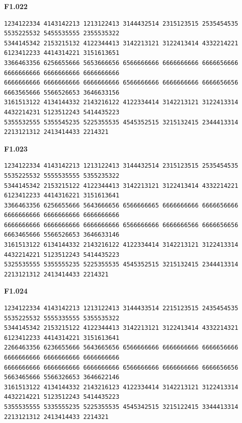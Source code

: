 \noindent\begin{minipage}{\linewidth}\textbf{F1.022}
\begin{lstlisting}
1234122334 4143142213 1213122413 3144432514 2315123515 2535454535 5535225532 5455535555 2355535322
5344145342 2153215132 4122344413 3142213121 3122413414 4332214221 6123412233 4414314221 3151613651
3366463356 6256655666 5653666656 6566666666 6666666666 6666656666 6666666666 6666666666 6666666666
6666666666 6666666666 6666666666 6566666666 6666666666 6666656656 6663565666 5566526653 3646633156
3161513122 4134144332 2143216122 4122334414 3142213121 3122413314 4432214231 5123512243 5414435223
5355532555 5355545235 5225355535 4545352515 3215132415 2344413314 2213121312 2413414433 2214321
\end{lstlisting}
\end{minipage}\par\smallskip

\noindent\begin{minipage}{\linewidth}\textbf{F1.023}
\begin{lstlisting}
1234122334 4143142213 1213122413 3144432514 2315123515 2535454535 5535225532 5555535555 5355235322
5344145342 2153215122 4122344413 3142213121 3122413414 4332214221 6123412233 4414316221 3151613641
3366463356 6256655666 5643666656 6566666665 6666666666 6666656666 6666666666 6666666666 6666666666
6666666666 6666666666 6666666666 6566666666 6666666566 6666656656 6663465666 5566526653 3646633146
3161513122 6134144332 2143216122 4122334414 3142213121 3122413314 4432214221 5123512243 5414435223
5325535555 5355555235 5225355535 4545352515 3215132415 2344413314 2213121312 2413414433 2214321
\end{lstlisting}
\end{minipage}\par\smallskip

\noindent\begin{minipage}{\linewidth}\textbf{F1.024}
\begin{lstlisting}
1234122334 4143142213 1213122413 3144433514 2215123515 2435454535 5535225532 5555335555 5355535322
5344145342 2153215122 4122344413 3142213121 3122413414 4332214321 6123412233 4414314221 3151613641
2266463356 6236655666 5643665656 6566666666 6666666666 6666656666 6666666666 6666666666 6666666666
6666666666 6666666666 6666666666 6566666666 6666666666 6666656656 5663465666 5566326653 3646622146
3161513122 4134144332 2143216123 4122334414 3142213121 3122413314 4432214221 5123512243 5414435223
5355535555 5335555235 5225355535 4545342515 3215122415 3344413314 2213121312 2413414433 2214321
\end{lstlisting}
\end{minipage}\par\smallskip

